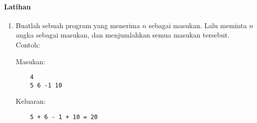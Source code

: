 \documentclass[../main.tex]{subfiles}
\begin{document}
\paragraph{Latihan}
\begin{enumerate}
	\item Buatlah sebuah program yang menerima \(n\) sebagai masukan. Lalu meminta \(n\) angka sebagai masukan, dan menjumlahkan semua masukan tersebut. Contoh:

	Masukan:

	\begin{verbatim}
	4
	5 6 -1 10
	\end{verbatim}

	Keluaran:

	\begin{verbatim}
	5 + 6 - 1 + 10 = 20
	\end{verbatim}
\end{enumerate}
\end{document}
